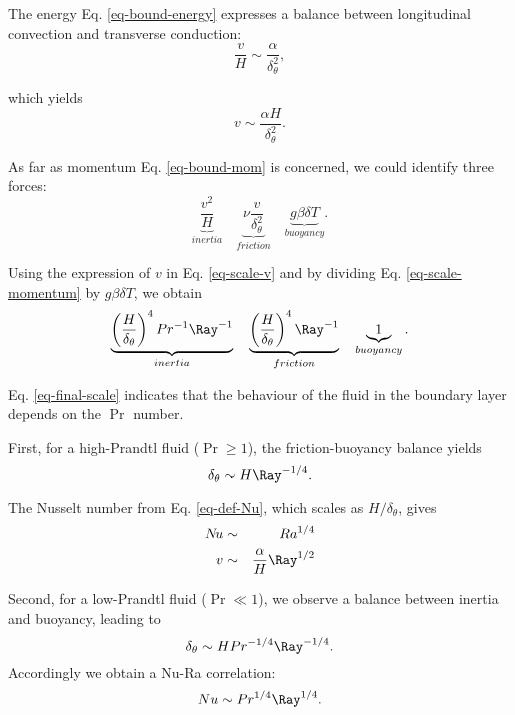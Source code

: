 \noindent The energy Eq. \ref{eq-bound-energy} expresses a balance between longitudinal convection and transverse conduction:
\begin{equation}
	\frac{v}{H} \sim \frac{\alpha}{\delta_\theta^2},
\end{equation}

\noindent which yields
\begin{equation} \label{eq-scale-v}
	v \sim \frac{\alpha H}{\delta_\theta^2}.
\end{equation}

\noindent As far as momentum Eq. \ref{eq-bound-mom} is concerned, we could identify three forces:
\begin{equation} \label{eq-scale-momentum}
	\underbrace{\frac{v^2}{H}}_{inertia} \quad \underbrace{\nu \frac{v}{\delta_\theta^2}}_{friction} \quad \underbrace{g \beta \delta T}_{buoyancy}.
\end{equation}

\noindent Using the expression of $v$ in Eq. \ref{eq-scale-v} and by dividing Eq. \ref{eq-scale-momentum} by $g \beta \delta T$, we obtain
\begin{equation} \label{eq-final-scale}
	\underbrace{\left( \frac{H}{\delta_\theta} \right)^4 Pr ^{-1} \Ray^{-1}}_{inertia} \quad  \underbrace{\left( \frac{H}{\delta_\theta} \right)^4 \Ray^{-1}}_{friction} \quad \underbrace{1}_{buoyancy}.
\end{equation}

\noindent Eq. \ref{eq-final-scale} indicates that the behaviour of the fluid in the boundary layer depends on the $\Pr$ number.

\noindent First, for a high-Prandtl fluid ($\Pr \geq 1$), the friction-buoyancy balance yields
\begin{equation} \label{eq-scale-nbd-high-Pr}
	\delta_\theta \sim H \Ray^{-1/4}.
\end{equation}

\noindent The Nusselt number from Eq. \ref{eq-def-Nu}, which scales as $H/\delta_\theta$, gives
\begin{eqnarray} 
	N\!u & \sim & Ra^{1/4} \\
	v & \sim & \frac{\alpha}{H} \Ray^{1/2}
\end{eqnarray}

\noindent Second, for a low-Prandtl fluid ($\Pr \ll 1$), we observe a balance between inertia and buoyancy, leading to
\begin{equation} \label{eq-corr-Low-Pr}
	\delta_\theta \sim H Pr^{-1/4} \Ray^{-1/4}.
\end{equation}
Accordingly we obtain a Nu-Ra correlation:
\begin{equation}
	Nu \sim Pr^{1/4} \Ray^{1/4}.
\end{equation}

